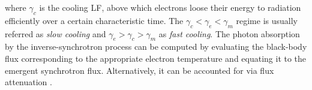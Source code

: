 %
where $\gamma_c$ is the cooling \ac{LF}, above which electrons loose their 
energy to radiation efficiently over a certain characteristic time.
%
The $\gamma_c < \gamma_e < \gamma_m$ regime is usually referred as \textit{slow cooling} and $\gamma_e > \gamma_c > \gamma_m$ as \textit{fast cooling}.
%
%
%
The photon absorption by the inverse-synchrotron process can be computed by evaluating 
the black-body flux corresponding to the appropriate electron temperature 
and equating it to the emergent synchrotron flux. Alternatively, it can be accounted for 
via flux attenuation \citep{Dermer:2009}.
%

